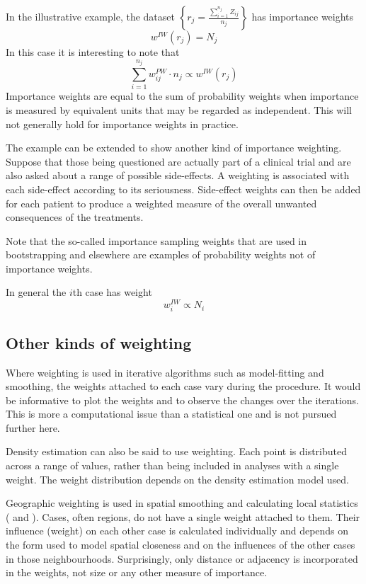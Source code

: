 \documentclass{svmult}
\begin{document}
In the illustrative example, the dataset $\left\{r_j=\frac{\sum_{i=1}^{n_j}Z_{ij}}{n_j}\right\}$ has importance weights 
$$w^{IW}(r_j)=N_j$$
In this case it is interesting to note that
$$\sum_{i=1}^{n_j}w_{ij}^{PW} \cdot  n_j \propto  w^{IW}(r_j)$$
Importance weights are equal to the sum of probability weights when importance is measured by equivalent units that may be regarded as independent.  This will not generally hold for importance weights in practice.

The example can be extended to show another kind of importance weighting.  Suppose that those being questioned are actually part of a clinical trial and are also asked about a range of possible side-effects.  A weighting is associated with each side-effect according to its seriousness.   Side-effect weights can then be added for each patient to produce a weighted measure of the overall unwanted consequences of the treatments.

Note that the so-called importance sampling weights that are used in bootstrapping and elsewhere are examples of probability weights not of importance weights.

In general the $i$th case has weight
$$w_i^{IW}\propto N_i$$

\subsection{Other kinds of weighting}
\label{otherw}
Where weighting is used in iterative algorithms such as model-fitting and smoothing, the weights attached to each case vary during the procedure.  It would be informative to plot the weights and to observe the changes over the iterations.  This is more a computational issue than a statistical one and is not pursued further here.

Density estimation can also be said to use weighting.  Each point is distributed across a range of values, rather than being included in analyses with a single weight.  The weight distribution depends on the density estimation model used.

Geographic weighting is used in spatial smoothing and calculating local statistics (\cite{unwin:1998b} and \cite{brunsdon:2007}).  Cases, often regions, do not have a single weight attached to them.  Their influence (weight) on each other case is calculated individually and depends on the form used to model spatial closeness and on the influences of the other cases in those neighbourhoods.  Surprisingly, only distance or adjacency is incorporated in the weights, not size or any other measure of importance.
\end{document}
